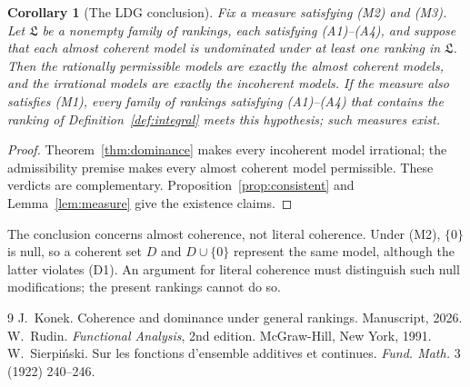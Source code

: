 \documentclass[11pt]{article}
\newtheorem{corollary}[theorem]{Corollary}
\theoremstyle{definition}
\newcommand{\Lf}{\mathfrak L}
\begin{document}
\begin{corollary}[The LDG conclusion]\label{cor:ldg}
Fix a measure satisfying (M2) and (M3). Let $\Lf$ be a nonempty family of rankings, each satisfying (A1)--(A4), and suppose that each almost coherent model is undominated under at least one ranking in $\Lf$. Then the rationally permissible models are exactly the almost coherent models, and the irrational models are exactly the incoherent models. If the measure also satisfies (M1), every family of rankings satisfying (A1)--(A4) that contains the ranking of Definition~\ref{def:integral} meets this hypothesis; such measures exist.
\end{corollary}
\begin{proof}
Theorem~\ref{thm:dominance} makes every incoherent model irrational; the admissibility premise makes every almost coherent model permissible. These verdicts are complementary. Proposition~\ref{prop:consistent} and Lemma~\ref{lem:measure} give the existence claims.
\end{proof}

The conclusion concerns almost coherence, not literal coherence. Under (M2), $\{0\}$ is
null, so a coherent set $D$ and $D\cup\{0\}$ represent the same model, although the latter
violates (D1). An argument for literal coherence must distinguish such null modifications;
the present rankings cannot do so.

\begin{thebibliography}{9}
 J.~Konek. Coherence and dominance under general rankings. Manuscript, 2026.
 W.~Rudin. \emph{Functional Analysis}, 2nd edition. McGraw-Hill, New York, 1991.
 W.~Sierpi\'nski. Sur les fonctions d'ensemble additives et continues. \emph{Fund. Math.} 3 (1922) 240--246.
\end{thebibliography}
\end{document}

